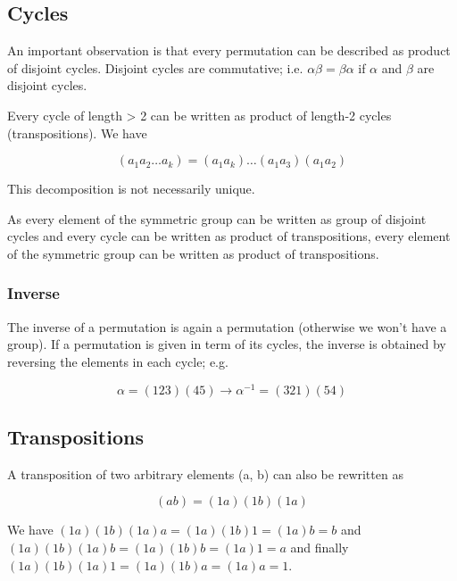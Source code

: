 
\subsection{Cycles}\label{cycles}

An important observation is that every permutation can be described as
product of disjoint cycles. Disjoint cycles are commutative; i.e.
\(\alpha \beta = \beta \alpha\) if \(\alpha\) and \(\beta\) are disjoint
cycles.

Every cycle of length \textgreater{} 2 can be written as product of
length-2 cycles (transpositions). We have

\begin{equation}
\label{eq:exp}
(a_1 a_2 \ldots a_k) = (a_1 a_k) \ldots (a_1 a_3)(a_1 a_2)
\end{equation}

This decomposition is not necessarily unique.

As every element of the symmetric group can be written as group of
disjoint cycles and every cycle can be written as product of
transpositions, every element of the symmetric group can be written as
product of transpositions.

\subsubsection{Inverse}\label{inverse}

The inverse of a permutation is again a permutation (otherwise we won't
have a group). If a permutation is given in term of its cycles, the
inverse is obtained by reversing the elements in each cycle; e.g.

\[
\alpha = (123)(45) \rightarrow \alpha^{-1} = (321)(54)
\]

\subsection{Transpositions}\label{transpositions}

A transposition of two arbitrary elements (a, b) can also be rewritten
as

\begin{equation}
\label{eq:transp}
(a b) = (1 a)(1 b)(1 a)
\end{equation}

We have \((1 a)(1 b)(1 a)a = (1 a)(1 b) 1 = (1 a)b = b\) and
\((1 a)(1 b)(1 a)b = (1 a)(1 b)b = (1 a)1 = a\) and finally
\((1 a)(1 b)(1 a)1 = (1 a)(1 b)a = (1 a)a = 1\).

